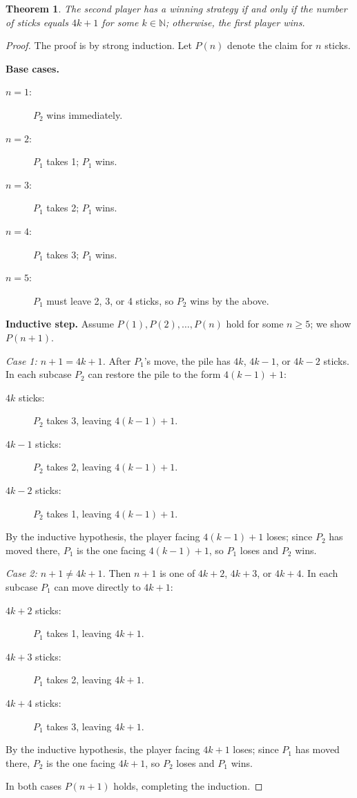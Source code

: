 \documentclass{article}
\newtheorem*{theorem}{Theorem}
\begin{document}
\begin{theorem}
    The second player has a winning strategy if and only if the number of sticks
    equals $4k+1$ for some $k \in \mathbb{N}$; otherwise, the first player wins.
\end{theorem}

\begin{proof}
    The proof is by strong induction. Let $P(n)$ denote the claim for $n$ sticks.

    \medskip
    \textbf{Base cases.}
    \begin{description}
        \item[$n=1$:] $P_2$ wins immediately.
        \item[$n=2$:] $P_1$ takes 1; $P_1$ wins.
        \item[$n=3$:] $P_1$ takes 2; $P_1$ wins.
        \item[$n=4$:] $P_1$ takes 3; $P_1$ wins.
        \item[$n=5$:] $P_1$ must leave 2, 3, or 4 sticks, so $P_2$ wins by the above.
    \end{description}

    \medskip
    \textbf{Inductive step.}
    Assume $P(1), P(2), \ldots, P(n)$ hold for some $n \geq 5$; we show $P(n+1)$.

    \medskip
    \textit{Case 1: $n+1 = 4k+1$.}
    After $P_1$'s move, the pile has $4k$, $4k-1$, or $4k-2$ sticks.
    In each subcase $P_2$ can restore the pile to the form $4(k-1)+1$:
    \begin{description}
        \item[$4k$ sticks:] $P_2$ takes 3, leaving $4(k-1)+1$.
        \item[$4k-1$ sticks:] $P_2$ takes 2, leaving $4(k-1)+1$.
        \item[$4k-2$ sticks:] $P_2$ takes 1, leaving $4(k-1)+1$.
    \end{description}
    By the inductive hypothesis, the player facing $4(k-1)+1$ loses; since $P_2$ has moved
    there, $P_1$ is the one facing $4(k-1)+1$, so $P_1$ loses and $P_2$ wins.

    \medskip
    \textit{Case 2: $n+1 \neq 4k+1$.}
    Then $n+1$ is one of $4k+2$, $4k+3$, or $4k+4$.
    In each subcase $P_1$ can move directly to $4k+1$:
    \begin{description}
        \item[$4k+2$ sticks:] $P_1$ takes 1, leaving $4k+1$.
        \item[$4k+3$ sticks:] $P_1$ takes 2, leaving $4k+1$.
        \item[$4k+4$ sticks:] $P_1$ takes 3, leaving $4k+1$.
    \end{description}
    By the inductive hypothesis, the player facing $4k+1$ loses; since $P_1$ has moved there,
    $P_2$ is the one facing $4k+1$, so $P_2$ loses and $P_1$ wins.

    \medskip
    In both cases $P(n+1)$ holds, completing the induction.
\end{proof}
\end{document}
